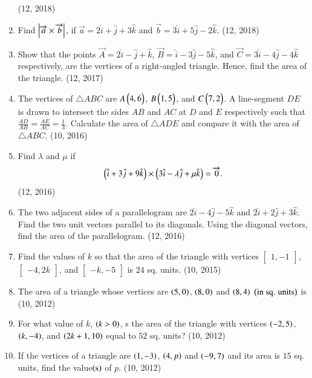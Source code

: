 \begin{enumerate}[label=\thesubsection.\arabic*,ref=\thesubsection.\theenumi]
\hfill (12, 2018) 
\item Find $\left\vert\overrightarrow{a} \times \overrightarrow{b}\right\vert$, if $\overrightarrow{a}=2\hat{i}+\hat{j}+3\hat{k}$ and $\overrightarrow{b}=3\hat{i}+5\hat{j}-2\hat{k}$.
\hfill (12, 2018) 
    \item Show that the points $\vec{A} = 2\hat{i} - \hat{j} + \hat{k}$, $\vec{B} = \hat{i} - 3\hat{j} - 5\hat{k}$, and $\vec{C} = 3\hat{i} - 4\hat{j} - 4\hat{k}$ respectively, are the vertices of a right-angled triangle. Hence, find the area of the triangle. \hfill (12, 2017)
    \item The vertices of $\triangle ABC$ are $A \begin{pmatrix}4, 6\end{pmatrix}$, $B \begin{pmatrix}1, 5\end{pmatrix}$, and $C \begin{pmatrix}7, 2\end{pmatrix}$. A line-segment $DE$ is drawn to intersect the sides $AB$ and $AC$ at $D$ and $E$ respectively such that $\frac{AD}{AB} = \frac{AE}{AC} = \frac{1}{3}$. Calculate the area of $\triangle ADE$ and compare it with the area of $\triangle ABC$. \hfill (10, 2016)
\item Find $\lambda$ and $\mu$ if
      \begin{align*}
          \begin{pmatrix}\hat{i} + 3\hat{j} + 9\hat{k}\end{pmatrix} \times \begin{pmatrix}3\hat{i} - \lambda \hat{j} + \mu \hat{k}\end{pmatrix} = \overrightarrow{0}.
      \end{align*}
      \hfill (12, 2016)
\item The two adjacent sides of a parallelogram are $2\hat{i}-4\hat{j}-5\hat{k}$ and $2\hat{i}+2\hat{j}+3\hat{k}$. Find the two unit vectors parallel to its diagonals. Using the diagonal vectors, find the area of the parallelogram. \hfill (12, 2016)
\item Find the values of $k$ so that the area of the triangle with vertices $\begin{bmatrix}1, -1\end{bmatrix}$, $\begin{bmatrix}-4, 2k\end{bmatrix}$, and $\begin{bmatrix}-k, -5\end{bmatrix}$ is $24$ sq. units. \hfill (10, 2015)
\item The area of a triangle whose vertices are $\left(5,0\right)$, $\left(8,0\right)$ and $\left(8,4\right)$ $\left(\text{in sq. units}\right)$ is
\hfill (10, 2012)
\item For what value of $k$, $\left( k > 0\right)$, s the area of the triangle with vertices $\left(-2,5\right)$, $\left(k,-4\right)$, and $\left(2k+1,10\right)$ equal to $52$ sq. units? 
\hfill (10, 2012)

\item If the vertices of a triangle are $\left(1,-3\right)$, $\left(4,p\right)$ and $\left(-9,7\right)$ and its area is $15$ sq. units, find the value$\left(\text{s}\right)$ of $p$. 
\hfill (10, 2012)


\end{enumerate}
